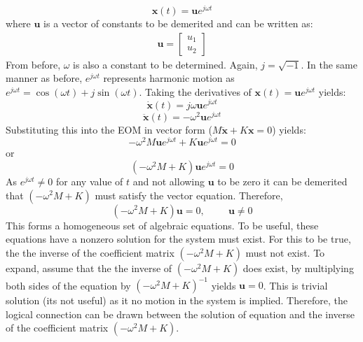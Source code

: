 \documentclass[12pt,letter]{article}
\numberwithin{ex}{section} %
\numberwithin{re}{section} %
\begin{document}
\begin{equation}
	\mathbf{x}(t) = \mathbf{u}e^{j\omega t}
\end{equation}
where $\mathbf{u}$ is a vector of constants to be demerited and can be written as:
\begin{eqnarray}
\mathbf{u}=  \begin{bmatrix} u_1 \\  u_2 \end{bmatrix}
\end{eqnarray}
From before, $\omega$ is also a constant to be determined. Again, $j=\sqrt{-1}$. In the same manner as before, $e^{j\omega t}$ represents harmonic motion as $e^{j\omega t} = \cos(\omega t) + j \sin(\omega t)$. Taking the derivatives of $\mathbf{x}(t) = \mathbf{u}e^{j\omega t}$ yields:
\begin{equation}
	\dot{\mathbf{x}}(t) = j\omega\mathbf{u}e^{j\omega t}
\end{equation}
\begin{equation}
	\ddot{\mathbf{x}}(t) = -\omega^2\mathbf{u}e^{j\omega t}
\end{equation}
Substituting this into the EOM in vector form ($M\mathbf{\ddot{x}} + K\mathbf{x} =0$) yields:
\begin{equation}
-\omega^2 M  \mathbf{u}e^{j\omega t} + K\mathbf{u}e^{j\omega t} =0
\end{equation}
or 
\begin{equation}
(-\omega^2 M  + K)\mathbf{u}e^{j\omega t} =0
\end{equation}
As $e^{j\omega t} \neq 0$ for any value of $t$ and not allowing $\mathbf{u}$ to be zero it can be demerited that $(-\omega^2 M  + K)$ must satisfy the vector equation. Therefore,
\begin{equation}
(-\omega^2 M  + K)\mathbf{u} =0, \hspace{1cm} \mathbf{u}\neq0
\end{equation}
This forms a homogeneous set of algebraic equations. To be useful, these equations have a nonzero solution for the system must exist. For this to be true, the the inverse of the coefficient matrix $(-\omega^2 M  + K)$ must not exist. To expand, assume that the the inverse of $(-\omega^2 M  + K)$ does exist, by multiplying both sides of the equation by $(-\omega^2 M  + K)^{-1}$ yields $\mathbf{u}=0$. This is trivial solution (its not useful) as it no motion in the system is implied. Therefore, the logical connection can be drawn between the  solution of equation and the inverse of the coefficient matrix $(-\omega^2 M  + K)$.
\end{document}
